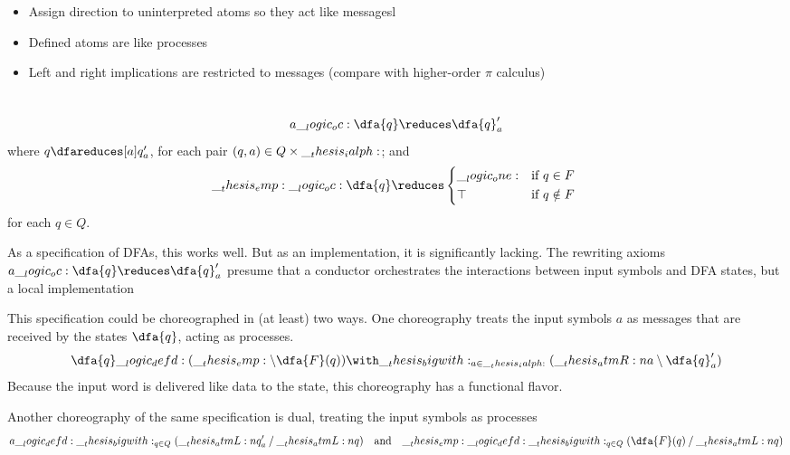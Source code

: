 \begin{itemize}
\item Assign direction to uninterpreted atoms so they act like messagesl
\item Defined atoms are like processes
\item Left and right implications are restricted to messages (compare with higher-order $\pi$ calculus)
\end{itemize}


\section{}

\begin{equation*}
  a \oc \dfa{q} \reduces \dfa{q}'_a
\end{equation*}
where $q \dfareduces[a] q'_a$, for each pair $(q, a) \in Q \times \__thesis_ialph:$; and 
\begin{equation*}
  \emp \oc \dfa{q} \reduces
    \begin{cases*}
      \one & if $q \in F$ \\
      \top & if $q \notin F$
    \end{cases*}
\end{equation*}
for each $q \in Q$.

As a specification of \acp{DFA}, this works well.
But as an implementation, it is significantly lacking.
The rewriting axioms $a \oc \dfa{q} \reduces \dfa{q}'_a$ presume that a conductor orchestrates the interactions between input symbols and \ac{DFA} states, but a local implementation 

This specification could be choreographed in (at least) two ways.
One choreography treats the input symbols $a$ as messages that are received by the states $\dfa{q}$, acting as processes.
\begin{equation*}
  \dfa{q} \defd (\emp \limp \dfa{F}(q)) \with \bigwith_{a \in \ialph}(\atmR{a} \limp \dfa{q}'_a)
\end{equation*}
Because the input word is delivered like data to the state, this choreography has a functional flavor.

Another choreography of the same specification is dual, treating the input symbols as processes
\begin{equation*}
  a \defd \bigwith_{q \in Q}(\atmL{q}'_a \pmir \atmL{q})
  \quad\text{and}\quad
  \emp \defd \bigwith_{q \in Q}(\dfa{F}(q) \pmir \atmL{q})
\end{equation*}

